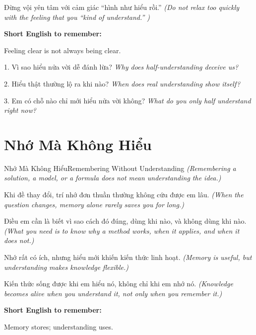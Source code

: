 \begin{baihoc}
Đừng vội yên tâm với cảm giác ``hình như hiểu rồi.''
\textit{(Do not relax too quickly with the feeling that you ``kind of understand.'' )}
\end{baihoc}

\begin{ghinhoanh}
\textbf{Short English to remember:}

Feeling clear is not always being clear.

\end{ghinhoanh}

\begin{tuhocnhanh}
1. Vì sao hiểu nửa vời dễ đánh lừa? \textit{Why does half-understanding deceive us?}

2. Hiểu thật thường lộ ra khi nào? \textit{When does real understanding show itself?}

3. Em có chỗ nào chỉ mới hiểu nửa vời không? \textit{What do you only half understand right now?}
\end{tuhocnhanh}
\ngancach

\section{Nhớ Mà Không Hiểu}
\begin{truyen}{Nhớ Mà Không Hiểu}{Remembering Without Understanding}
\textit{(Remembering a solution, a model, or a formula does not mean understanding the idea.)}

Khi đề thay đổi, trí nhớ đơn thuần thường không cứu được em lâu.
\textit{(When the question changes, memory alone rarely saves you for long.)}

Điều em cần là biết vì sao cách đó đúng, dùng khi nào, và không dùng khi nào.
\textit{(What you need is to know why a method works, when it applies, and when it does not.)}

Nhớ rất có ích, nhưng hiểu mới khiến kiến thức linh hoạt.
\textit{(Memory is useful, but understanding makes knowledge flexible.)}
\end{truyen}

\begin{baihoc}
Kiến thức sống được khi em hiểu nó, không chỉ khi em nhớ nó.
\textit{(Knowledge becomes alive when you understand it, not only when you remember it.)}
\end{baihoc}

\begin{ghinhoanh}
\textbf{Short English to remember:}

Memory stores; understanding uses.

\end{ghinhoanh}

